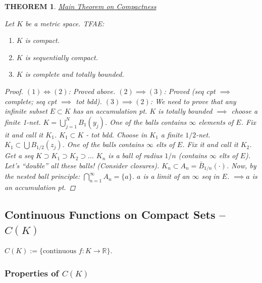 \documentclass[12pt]{article}
\theoremstyle{blueplain}
\newtheorem{theorem}{THEOREM}[section]
\theoremstyle{bluedef}
\theoremstyle{blueremark}
\newcommand{\R}{\mathbb{R}}
\numberwithin{equation}{section}
\begin{document}
      \begin{theorem}\underline{Main Theorem on Compactness}

        Let $K$ be a metric space. TFAE:
        \begin{enumerate}
          \item $K$ is compact.
          \item $K$ is sequentially compact.
          \item $K$ is complete and totally bounded.
        \end{enumerate}
        \begin{proof}
          $(1) \iff (2)$: Proved above.
          $(2) \implies (3)$: Proved (seq cpt $\implies$ complete; seq cpt $\implies$ tot bdd).
          $(3) \implies (2)$: We need to prove that any infinite subset $E \subset K$ has an accumulation pt.
          $K$ is totally bounded $\implies$ choose a finite 1-net. $K = \bigcup_{j=1}^N B_1(y_j)$.
          One of the balls contains $\infty$ elements of $E$.
          Fix it and call it $K_1$.
          $K_1 \subset K$ - tot bdd.
          Choose in $K_1$ a finite $1/2$-net. $K_1 \subset \bigcup B_{1/2}(z_j)$.
          One of the balls contains $\infty$ elts of $E$. Fix it and call it $K_2$.
          Get a seq $K \supset K_1 \supset K_2 \supset \dots$
          $K_n$ is a ball of radius $1/n$ (contains $\infty$ elts of $E$).
          Let's ``double'' all these balls! (Consider closures).
          $K_n \subset A_n = \bar{B}_{1/n}(\cdot)$.
          Now, by the nested ball principle:
          $\bigcap_{n=1}^\infty A_n = \{a\}$. $a$ is a limit of an $\infty$ seq in $E$.
          $\implies a$ is an accumulation pt.
        \end{proof}
      \end{theorem}

      \clearpage

      \subsection{Continuous Functions on Compact Sets -- $C(K)$}

    $C(K) := \{ \text{continuous } f: K \to \R \}$.

      \subsubsection{Properties of $C(K)$}
\end{document}

